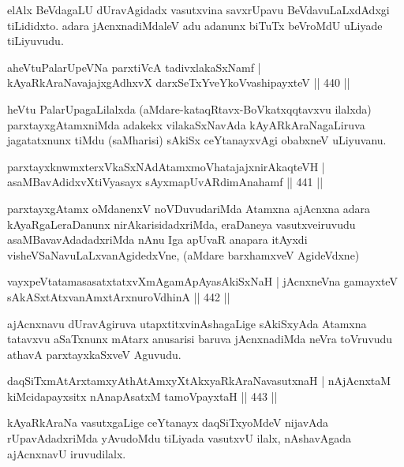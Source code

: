 \begin{artha}
elAlx BeVdagaLU dUravAgidadx vasutxvina savxrUpavu BeVdavuLaLxdAdxgi
tiLididxto. adara jAcnxnadiMdaleV adu adanunx biTuTx beVroMdU uLiyade tiLiyuvudu.
\end{artha}

\begin{shl}
aheVtuPalarUpeVNa parxtiVcA tadivxlakaSxNamf |
kAyaRkAraNavajajxgAdhxvX darxSeTxYveYkoV\s vashipayxteV \hfill  || 440 ||
\end{shl}

\begin{artha}
heVtu PalarUpagaLilalxda (aMdare-kataqRtavx-BoVkatxqqtavxvu ilalxda) parxtayxgAtamxniMda adakekx vilakaSxNavAda kAyARkAraNagaLiruva jagatatxnunx tiMdu (saMharisi) sAkiSx ceYtanayxvAgi obabxneV uLiyuvanu.
\end{artha}

\begin{shl}
parxtayxknwmxterxVkaSxNAdAtamxmoVhatajajxnirAkaqteVH |
asaMBavAdidxvXtiVyasayx sAyxmapUvARdimAnahamf \hfill  || 441 ||
\end{shl}

\begin{artha}
parxtayxgAtamx oMdanenxV noVDuvudariMda Atamxna ajAcnxna adara
kAyaRgaLeraDanunx nirAkarisidadxriMda, eraDaneya vasutxveiruvudu
asaMBavavAdadadxriMda nAnu Iga apUvaR anapara itAyxdi
visheVSaNavuLaLxvanAgidedxVne, (aMdare barxhamxveV AgideVdxne) 
\end{artha}

\begin{shl}
vayxpeVtatamasasatxtatxvXmAgamApAyasAkiSxNaH |
jAcnxneVna gamayxteV sAkASxtAtxvanAmxtArxnuroVdhinA \hfill  || 442 ||
\end{shl}

\begin{artha}
ajAcnxnavu dUravAgiruva utapxtitxvinAshagaLige  sAkiSxyAda Atamxna tatavxvu aSaTxnunx mAtarx anusarisi baruva jAcnxnadiMda neVra toVruvudu athavA parxtayxkaSxveV Aguvudu.
\end{artha}

\begin{shl}
daqSiTxmAtArxtamxyAthAtAmxyXtAkxyaRkAraNavasutxnaH |
nAjAcnxtaM kiMcidapayxsitx nAnapAsatxM tamoV\s payxtaH \hfill  || 443 ||
\end{shl}

\begin{artha}
kAyaRkAraNa vasutxgaLige ceYtanayx daqSiTxyoMdeV nijavAda rUpavAdadxriMda yAvudoMdu tiLiyada vasutxvU ilalx, nAshavAgada ajAcnxnavU iruvudilalx.
\end{artha}

